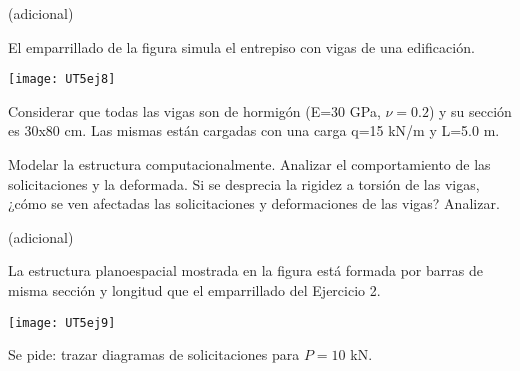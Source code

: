 \ejercicio (adicional) 

El emparrillado de la figura simula el entrepiso con vigas de una edificación. 

\begin{center}
	\texttt{[image: UT5ej8]}
\end{center}

Considerar que todas las vigas son de hormigón (E=30 GPa, $\nu=0.2$) y su sección es 30x80 cm. Las mismas están cargadas con una carga q=15 kN/m y L=5.0 m.

\parte Modelar la estructura computacionalmente. Analizar el comportamiento de las solicitaciones y la deformada.
\parte Si se desprecia la rigidez a torsión de las vigas, ¿cómo se ven afectadas las solicitaciones y deformaciones de las vigas? Analizar.


\ejercicio (adicional) 

La estructura planoespacial mostrada en la figura está formada por barras de misma sección y longitud que el emparrillado del Ejercicio 2.

\begin{center}
	\texttt{[image: UT5ej9]}
\end{center}

Se pide: trazar diagramas de solicitaciones para $P=10$ kN.

